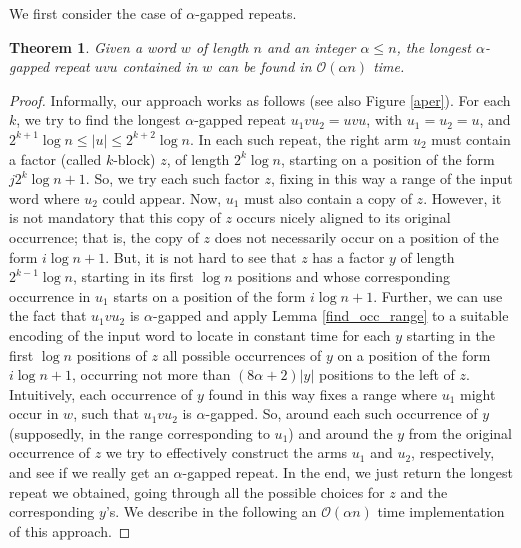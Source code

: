 \documentclass[final]{dmtcs-episciences}
\newcommand{\bigo}{{\mathcal O}}
\newtheorem{theorem}{Theorem}
\begin{document}
We first consider the case of $\alpha$-gapped repeats.
\begin{theorem}\label{algorithm_rep_case_aperiodic}
Given a word $w$ of length $n$ and an integer $\alpha\leq  n$, the longest $\alpha$-gapped repeat $uvu$ contained in $w$ can be found in $\bigo(\alpha n)$ time. 
\end{theorem}
\begin{proof}
Informally, our approach works as follows (see also Figure \ref{aper}). For each $k$, we try to find the longest $\alpha$-gapped repeat $u_1vu_2=uvu$, with $u_1=u_2=u$, and $2^{k+1} \log n \leq |u| \leq 2^{k+2}\log n$. In each such repeat, the right arm $u_2$ must contain a factor (called $k$-block) $z$, of length $2^k \log n$, starting on a position of the form $j2^k \log n+1$. So, we try each such factor $z$, fixing in this way a range of the input word where $u_2$ could appear. Now, $u_1$ must also contain a copy of $z$. However, it is not mandatory that this copy of $z$ occurs nicely aligned to its original occurrence; that is, the copy of $z$ does not necessarily occur on a position of the form $i \log n+1$. But, it is not hard to see that $z$ has a factor $y$ of length~$2^{k-1}\log n$, starting in its first $\log n$ positions and whose corresponding occurrence in $u_1$ starts on a position of the form $i \log n+1$. Further, we can use the fact that $u_1vu_2$ is $\alpha$-gapped and apply Lemma \ref{find_occ_range} to a suitable encoding of the input word to locate in constant time for each $y$ starting in the first $\log n$ positions of $z$ all possible occurrences of $y$ on a position of the form $i \log n+1$, occurring not more than $(8\alpha+2) |y|$ positions to the left of $z$. Intuitively, each occurrence of $y$ found in this way fixes a range where $u_1$ might occur in $w$, such that $u_1vu_2$ is $\alpha$-gapped. So, around each such occurrence of $y$ (supposedly, in the range corresponding to $u_1$) and around the $y$ from the original occurrence of $z$ we try to effectively construct the arms $u_1$ and $u_2$, respectively, and see if we really get an $\alpha$-gapped repeat. In the end, we just return the longest repeat we obtained, going through all the possible choices for $z$ and the corresponding $y$'s. We describe in the following an $\bigo(\alpha n)$ time implementation of this approach.


\end{proof}
\end{document}
